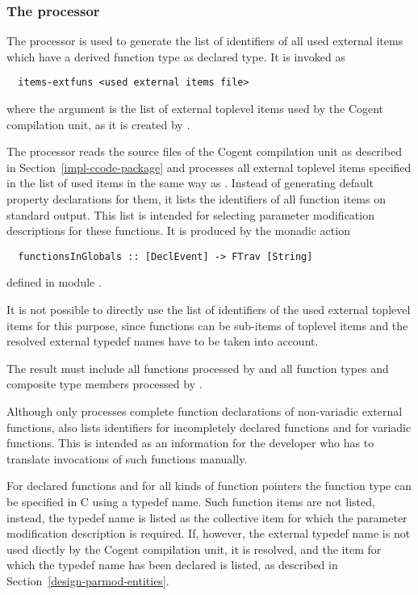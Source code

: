 \subsubsection{The processor }

The processor  is used to generate the list of identifiers of all used external items which 
have a derived function type as declared type. It is invoked as
\begin{verbatim}
  items-extfuns <used external items file>
\end{verbatim}
where the argument is the list of external toplevel items used by the Cogent compilation unit, as it is created 
by .

The processor reads the source files of the Cogent compilation unit as described in Section~\ref{impl-ccode-package}
and processes all external toplevel items specified in the list of used items in the same way as .
Instead of generating default property declarations for them, it lists the identifiers of all function items on 
standard output. This list is intended for selecting parameter modification descriptions for these functions. It
is produced by the monadic action
\begin{verbatim}
  functionsInGlobals :: [DeclEvent] -> FTrav [String]
\end{verbatim}
defined in module .

It is not possible to directly use the list of identifiers of the used external toplevel items for this purpose, since 
functions can be sub-items of toplevel items and the resolved external typedef names have to be taken into account.

The result must include all functions processed by  and all function types and composite type members
processed by . 

Although  only processes complete function declarations of non-variadic external functions, 
 also lists identifiers for incompletely declared functions and for variadic functions.
This is intended as an information for the developer who has to translate invocations of such functions manually.

For declared functions and for all kinds of function pointers the function type can be specified in C using a typedef name.
Such function items are not listed, instead, the typedef name is listed as the collective item for which the parameter
modification description is required. If, however, the external typedef name is not used diectly by the Cogent compilation
unit, it is resolved, and the item for which the typedef name has been declared is listed, as described in 
Section~\ref{design-parmod-entities}.

